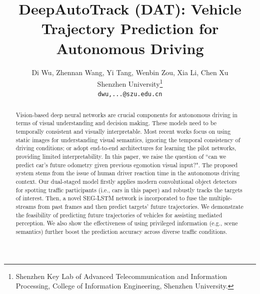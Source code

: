 \documentclass[10pt,twocolumn,letterpaper]{article}
\begin{document}
\title{DeepAutoTrack (DAT): Vehicle Trajectory Prediction for Autonomous Driving}

\author{Di Wu, Zhennan Wang, Yi Tang,  Wenbin Zou, Xia Li, Chen Xu\\
Shenzhen University\thanks{Shenzhen Key Lab of Advanced Telecommunication and Information Processing, College of Information Engineering, Shenzhen University.}\\
{\tt\small dwu,...@szu.edu.cn}}
\maketitle
\begin{abstract}

Vision-based deep neural networks are crucial components for autonomous driving in terms of visual understanding and decision making.
These models need to be temporally consistent and visually interpretable.
Most recent works focus on using static images for understanding visual semantics, ignoring the temporal consistency of driving conditions; or adopt end-to-end architectures for learning the pilot networks, providing limited interpretability.
In this paper, we raise the question of ``can we predict car's future odometry given previous egomotion visual input?".
The proposed system stems from the issue of human driver reaction time in the autonomous driving context.
Our dual-staged model firstly applies modern convolutional object detectors for spotting traffic participants (i.e., cars in this paper) and robustly tracks the targets of interest.
Then, a novel SEG-LSTM network is incorporated to fuse the multiple-streams from past frames and then predict targets' future trajectories.
We demonstrate the feasibility of predicting future trajectories of vehicles for assisting mediated perception.
 We also show the effectiveness of using privileged information (e.g., scene semantics) further boost the prediction accuracy across diverse traffic conditions.
\end{abstract}
\end{document}
